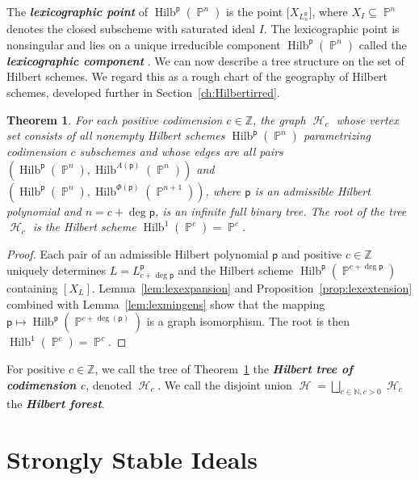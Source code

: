 \documentclass[12pt]{amsart}%
\newtheorem{theorem}{Theorem}[section]
\theoremstyle{definition}%
\DeclareMathOperator{\hilb}{Hilb}%
\DeclareMathOperator{\PP}{\mathbb{P}}%
\DeclareMathOperator{\hilbtree}{\mathscr{H}}%
\newcommand{\hp}{\mathsf{p}}%
\newcommand{\lift}{\Phi}%
\newcommand{\plus}{A}%
\newcommand{\NN}{\mathbb{N}}%
\newcommand{\ZZ}{\mathbb{Z}}%
\begin{document}
The \emph{\bfseries lexicographic point} of $\hilb^{\hp}(\PP^n)$ is
the point $\big[X_{L^{\hp}_n}\big]$, where $X_{I} \subseteq \PP^n$ denotes the
closed subscheme with saturated ideal $I$.  The lexicographic point is
nonsingular and lies on a unique irreducible component
$\hilb^{\hp}(\PP^n)$ called the \emph{\bfseries lexicographic
  component} \cite{Reeves--Stillman--1997}.  We can now describe a
tree structure on the set of Hilbert schemes.  We regard this as a
rough chart of the geography of Hilbert schemes, developed further in
Section~\ref{ch:Hilbertirred}.

\begin{theorem}
  \label{thm:hilbtree}
  For each positive codimension $c \in \ZZ$, the graph $\hilbtree_c$
  whose vertex set consists of all nonempty Hilbert schemes
  $\hilb^{\hp}(\PP^n)$ parametrizing codimension $c$ subschemes and
  whose edges are all pairs $\left( \hilb^{\hp}(\PP^n),
  \hilb^{\plus(\hp)}(\PP^n) \right)$ and $\left( \hilb^{\hp}(\PP^n),
  \hilb^{\lift(\hp)}(\PP^{n+1}) \right)$, where $\hp$ is an admissible
  Hilbert polynomial and $n = c + \deg \hp$, is an infinite full
  binary tree.  The root of the tree $\hilbtree_c$ is the Hilbert
  scheme $\hilb^1(\PP^c) = \PP^c$.
\end{theorem}

\begin{proof}
  Each pair of an admissible Hilbert polynomial $\hp$ and positive $c
  \in \ZZ$ uniquely determines $L = L^{\hp}_{c + \deg \hp}$ and the
  Hilbert scheme $\hilb^{\hp}(\PP^{c + \deg \hp})$ containing $[X_L]$.
  Lemma~\ref{lem:lexexpansion} and Proposition~\ref{prop:lexextension}
  combined with Lemma~\ref{lem:lexmingens} show that the mapping $\hp
  \mapsto \hilb^{\hp}(\PP^{c + \deg(\hp)})$ is a graph isomorphism.
  The root is then $\hilb^1(\PP^c) = \PP^c$.
\end{proof}

For positive $c \in \ZZ$, we call the tree of
Theorem~\ref{thm:hilbtree} the \emph{\bfseries Hilbert tree of
  codimension $c$}, denoted $\hilbtree_c$.  We call the disjoint union
$\hilbtree = \bigsqcup_{c \in \NN, c > 0} \hilbtree_c$ the
\emph{\bfseries Hilbert forest}.




\section{Strongly Stable Ideals}
\label{ch:stronglystable}
\end{document}
